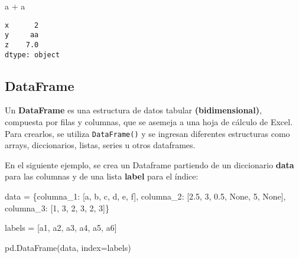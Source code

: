 \documentclass[
  letterpaper,
  DIV=11,
  numbers=noendperiod]{scrreprt}
\newenvironment{Shaded}{\begin{snugshade}}{\end{snugshade}}
\newcommand{\DecValTok}[1]{\textcolor[rgb]{0.68,0.00,0.00}{#1}}
\newcommand{\FloatTok}[1]{\textcolor[rgb]{0.68,0.00,0.00}{#1}}
\newcommand{\NormalTok}[1]{\textcolor[rgb]{0.00,0.23,0.31}{#1}}
\newcommand{\OperatorTok}[1]{\textcolor[rgb]{0.37,0.37,0.37}{#1}}
\newcommand{\StringTok}[1]{\textcolor[rgb]{0.13,0.47,0.30}{#1}}
\newcommand{\VariableTok}[1]{\textcolor[rgb]{0.07,0.07,0.07}{#1}}
\begin{document}
\begin{Shaded}
\begin{Highlighting}[]
\NormalTok{a }\OperatorTok{+}\NormalTok{ a}
\end{Highlighting}
\end{Shaded}

\begin{verbatim}
x      2
y     aa
z    7.0
dtype: object
\end{verbatim}

\subsection{\texorpdfstring{\textbf{DataFrame}}{DataFrame}}\label{dataframe}

Un \textbf{DataFrame} es una estructura de datos tabular
\textbf{(bidimensional)}, compuesta por filas y columnas, que se asemeja
a una hoja de cálculo de Excel. Para crearlos, se utiliza
\texttt{DataFrame()} y se ingresan diferentes estructuras como arrays,
diccionarios, listas, series u otros dataframes.

En el siguiente ejemplo, se crea un Dataframe partiendo de un
diccionario \textbf{data} para las columnas y de una lista
\textbf{label} para el índice:

\begin{Shaded}
\begin{Highlighting}[]
\NormalTok{data }\OperatorTok{=}\NormalTok{ \{}\StringTok{\textquotesingle{}columna\_1\textquotesingle{}}\NormalTok{: [}\StringTok{\textquotesingle{}a\textquotesingle{}}\NormalTok{, }\StringTok{\textquotesingle{}b\textquotesingle{}}\NormalTok{, }\StringTok{\textquotesingle{}c\textquotesingle{}}\NormalTok{, }\StringTok{\textquotesingle{}d\textquotesingle{}}\NormalTok{, }\StringTok{\textquotesingle{}e\textquotesingle{}}\NormalTok{, }\StringTok{\textquotesingle{}f\textquotesingle{}}\NormalTok{],}
        \StringTok{\textquotesingle{}columna\_2\textquotesingle{}}\NormalTok{: [}\FloatTok{2.5}\NormalTok{, }\DecValTok{3}\NormalTok{, }\FloatTok{0.5}\NormalTok{, }\VariableTok{None}\NormalTok{, }\DecValTok{5}\NormalTok{, }\VariableTok{None}\NormalTok{],}
        \StringTok{\textquotesingle{}columna\_3\textquotesingle{}}\NormalTok{: [}\DecValTok{1}\NormalTok{, }\DecValTok{3}\NormalTok{, }\DecValTok{2}\NormalTok{, }\DecValTok{3}\NormalTok{, }\DecValTok{2}\NormalTok{, }\DecValTok{3}\NormalTok{]\}}

\NormalTok{labels }\OperatorTok{=}\NormalTok{ [}\StringTok{\textquotesingle{}a1\textquotesingle{}}\NormalTok{, }\StringTok{\textquotesingle{}a2\textquotesingle{}}\NormalTok{, }\StringTok{\textquotesingle{}a3\textquotesingle{}}\NormalTok{, }\StringTok{\textquotesingle{}a4\textquotesingle{}}\NormalTok{, }\StringTok{\textquotesingle{}a5\textquotesingle{}}\NormalTok{, }\StringTok{\textquotesingle{}a6\textquotesingle{}}\NormalTok{]}

\NormalTok{pd.DataFrame(data, index}\OperatorTok{=}\NormalTok{labels)}
\end{Highlighting}
\end{Shaded}
\end{document}
